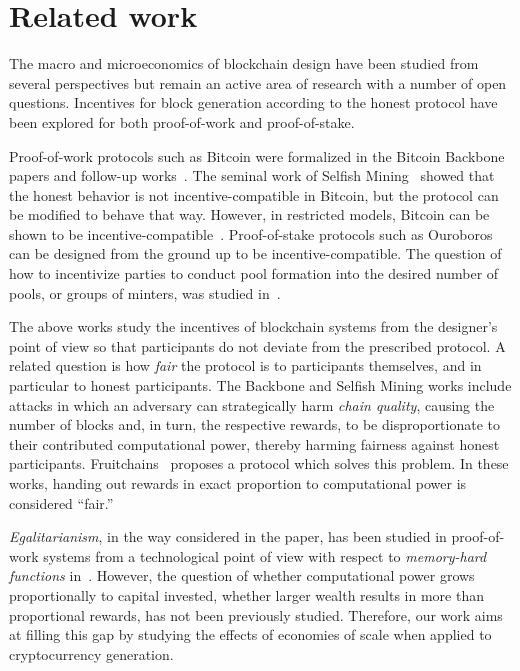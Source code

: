 \section{Related work}\label{sec:related}
The macro and microeconomics of blockchain design have been studied from
several perspectives but remain an active area of research with a number of open questions.
Incentives for block generation
according to the honest protocol have been explored for both proof-of-work and
proof-of-stake.

Proof-of-work protocols such as Bitcoin were formalized in the Bitcoin
Backbone~\cite{EC:GarKiaLeo15,C:GarKiaLeo17} papers and follow-up
works~\cite{pass2017analysis}. The seminal work of Selfish
Mining~\cite{FC:EyaSir14,FC:SapSomZoh16} showed that the honest behavior is not
incentive-compatible in Bitcoin, but the protocol can be modified to behave
that way. However, in restricted models, Bitcoin can be shown to be incentive-compatible~\cite{kiayias2016blockchain}.  Proof-of-stake protocols such as
Ouroboros~\cite{C:KRDO17} can be designed from the ground up to be
incentive-compatible. The question of how to incentivize parties to conduct
pool formation into the desired number of pools, or groups of minters, was
studied in~\cite{bkks2018}.

The above works study the incentives of blockchain systems from the designer's
point of view so that participants do not deviate from the prescribed protocol.
A related question is how \emph{fair} the protocol is to participants
themselves, and in particular to honest participants. The Backbone and Selfish
Mining works include attacks in which an adversary can strategically harm
\emph{chain quality}, causing the number of blocks and, in turn, the respective
rewards, to be disproportionate to their contributed computational power, thereby
harming fairness against honest participants. Fruitchains~\cite{PODC:PasShi17}
proposes a protocol which solves this problem. In these works,
handing out rewards in exact proportion to computational power is considered
``fair.''

\emph{Egalitarianism}, in the way considered in the paper, has been studied in
proof-of-work systems from a technological point of view with respect to
\emph{memory-hard functions} in~\cite{alwen2017depth,biryukov2016egalitarian}.
However, the question
of whether computational power grows proportionally to capital invested, \ie
whether larger wealth results in more than proportional rewards, has not
been previously studied. Therefore, our work aims at filling this gap by
studying the effects of economies of scale when applied to cryptocurrency
generation.

